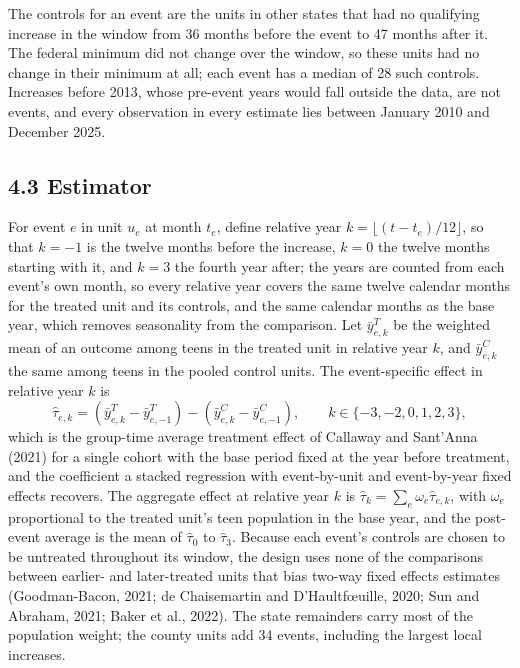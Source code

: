 \documentclass[12pt]{article}
\begin{document}
The controls for an event are the units in other states that had no qualifying increase in the window from 36 months before the event to 47 months after it. The federal minimum did not change over the window, so these units had no change in their minimum at all; each event has a median of 28 such controls. Increases before 2013, whose pre-event years would fall outside the data, are not events, and every observation in every estimate lies between January 2010 and December 2025.

\subsection{4.3 Estimator}

For event $e$ in unit $u_e$ at month $t_e$, define relative year $k = \lfloor (t - t_e)/12 \rfloor$, so that $k = -1$ is the twelve months before the increase, $k = 0$ the twelve months starting with it, and $k = 3$ the fourth year after; the years are counted from each event's own month, so every relative year covers the same twelve calendar months for the treated unit and its controls, and the same calendar months as the base year, which removes seasonality from the comparison. Let $\bar{y}^T_{e,k}$ be the weighted mean of an outcome among teens in the treated unit in relative year $k$, and $\bar{y}^C_{e,k}$ the same among teens in the pooled control units. The event-specific effect in relative year $k$ is
\begin{equation}
\hat\tau_{e,k} = \left( \bar{y}^T_{e,k} - \bar{y}^T_{e,-1} \right) - \left( \bar{y}^C_{e,k} - \bar{y}^C_{e,-1} \right), \qquad k \in \{-3,-2,0,1,2,3\},

\end{equation}
which is the group-time average treatment effect of Callaway and Sant'Anna (2021) for a single cohort with the base period fixed at the year before treatment, and the coefficient a stacked regression with event-by-unit and event-by-year fixed effects recovers. The aggregate effect at relative year $k$ is $\hat\tau_k = \sum_e \omega_e \hat\tau_{e,k}$, with $\omega_e$ proportional to the treated unit's teen population in the base year, and the post-event average is the mean of $\hat\tau_0$ to $\hat\tau_3$. Because each event's controls are chosen to be untreated throughout its window, the design uses none of the comparisons between earlier- and later-treated units that bias two-way fixed effects estimates (Goodman-Bacon, 2021; de Chaisemartin and D'Haultf{\oe}uille, 2020; Sun and Abraham, 2021; Baker et al., 2022). The state remainders carry most of the population weight; the county units add 34 events, including the largest local increases.
\end{document}
